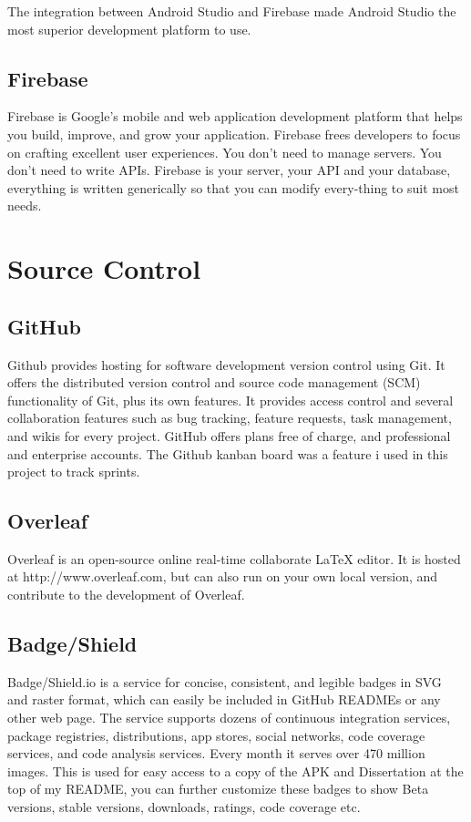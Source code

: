 The integration between Android Studio and Firebase made Android Studio the most superior development platform to use.

\subsection{Firebase}
Firebase  is  Google’s  mobile  and  web  application  development  platform  that helps you build,  improve,  and grow your application.  Firebase frees developers to focus on crafting excellent user experiences.  You don’t need to manage servers.  You don’t need to write APIs.  Firebase is your server, your API and your database, everything is written generically so that you can modify every-thing  to  suit  most  needs.   

\section{Source Control}

\subsection{GitHub}
Github provides hosting for software development version control using Git. It offers the distributed version control and source code management (SCM) functionality of Git, plus its own features. It provides access control and several collaboration features such as bug tracking, feature requests, task management, and wikis for every project. GitHub offers plans free of charge, and professional and enterprise accounts. The Github kanban board was a feature i used in this project to track sprints.

\subsection{Overleaf}
Overleaf is an open-source online real-time collaborate LaTeX editor. It is hosted at http://www.overleaf.com, but can also run on your own local version, and contribute to the development of Overleaf.
\subsection{Badge/Shield}
Badge/Shield.io is a service for concise, consistent, and legible badges in SVG and raster format, which can easily be included in GitHub READMEs or any other web page. The service supports dozens of continuous integration services, package registries, distributions, app stores, social networks, code coverage services, and code analysis services. Every month it serves over 470 million images.
This is used for easy access to a copy of the APK and Dissertation at the top of my README, you can further customize these badges to show Beta versions, stable versions, downloads, ratings, code coverage etc.


